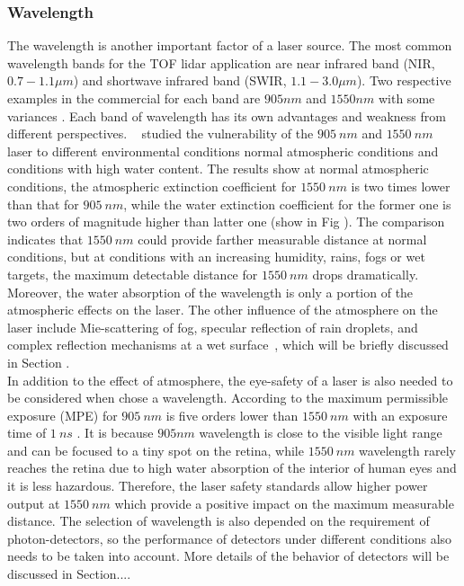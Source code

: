 \subsubsection{Wavelength}
The wavelength is another important factor of a laser source. The most common wavelength bands for the TOF lidar application are near infrared band (NIR, $0.7-1.1\mu m$) and shortwave infrared band (SWIR, $1.1-3.0\mu m$). Two respective examples in the commercial for each band are $905 nm$ and $1550 nm$ with some variances . Each band of wavelength has its own advantages and weakness from different perspectives. ~\citep{wojtanowski2014comparison} studied the vulnerability of the $905~nm$ and $1550~nm$ laser to different environmental conditions \wrt normal atmospheric conditions and conditions with high water content. The results show at normal atmospheric conditions, the atmospheric extinction coefficient for $1550~nm$ is two times lower than that for $905~nm$, while the water extinction coefficient for the former one is two orders of magnitude higher than latter one (show in Fig ). The comparison indicates that $1550~nm$ could provide farther measurable distance at normal conditions, but at conditions with an increasing humidity, rains, fogs or wet targets, the maximum detectable distance for $1550~nm$ drops dramatically. Moreover, the water absorption of the wavelength is only a portion of the atmospheric effects on the laser. The other influence of the atmosphere on the laser include Mie-scattering of fog, specular reflection of rain droplets, and complex reflection mechanisms at a wet surface~\citep{wojtanowski2014comparison}, which will be briefly discussed in Section .\\
In addition to the effect of atmosphere, the eye-safety of a laser is also needed to be considered when chose a wavelength. According to  the maximum permissible exposure (MPE) for $905~nm$ is five orders lower than $1550~nm$ with an exposure time of $1~ns$ . It is because $905 nm$ wavelength is close to the visible light range and can be focused to a tiny spot on the retina, while $1550~nm$ wavelength rarely reaches the retina due to high water absorption of the interior of human eyes and it is less hazardous. Therefore, the laser safety standards allow higher power output at $1550~nm$ which provide a positive impact on the maximum measurable distance.
The selection of wavelength is also depended on the requirement of photon-detectors, so the performance of detectors under different conditions also needs to be taken into account. More details of the behavior of detectors will be discussed in Section.... 
